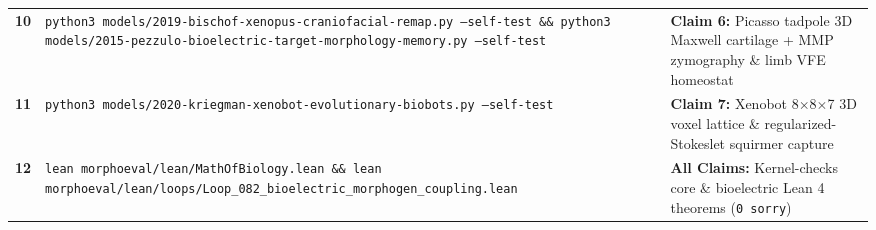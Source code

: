 \documentclass[10pt,a4paper]{article}
\begin{document}
\begin{table}[h!]
\begin{tabular}{@{}p{}p{}p{}@{}}
\textbf{10} & \texttt{python3 models/2019-bischof-xenopus-craniofacial-remap.py --self-test \&\& python3 models/2015-pezzulo-bioelectric-target-morphology-memory.py --self-test} & \textbf{Claim 6:} Picasso tadpole 3D Maxwell cartilage + MMP zymography \& limb VFE homeostat \\
\rowcolor{softgray}
\textbf{11} & \texttt{python3 models/2020-kriegman-xenobot-evolutionary-biobots.py --self-test} & \textbf{Claim 7:} Xenobot 8$\times$8$\times$7 3D voxel lattice \& regularized-Stokeslet squirmer capture \\
\textbf{12} & \texttt{lean morphoeval/lean/MathOfBiology.lean \&\& lean morphoeval/lean/loops/Loop\_082\_bioelectric\_morphogen\_coupling.lean} & \textbf{All Claims:} Kernel-checks core \& bioelectric Lean 4 theorems (\texttt{0 sorry}) \\
\bottomrule
\end{tabular}
\end{table}
\end{document}
